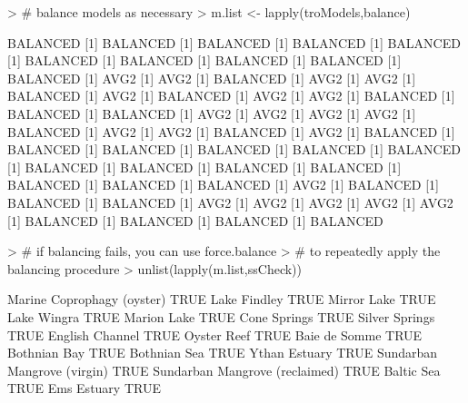\documentclass[11pt]{article}
\begin{document}
\begin{Schunk}
\begin{Sinput}
> # balance models as necessary
> m.list <- lapply(troModels,balance)
\end{Sinput}
\begin{Soutput}
[1] BALANCED
[1] BALANCED
[1] BALANCED
[1] BALANCED
[1] BALANCED
[1] BALANCED
[1] BALANCED
[1] BALANCED
[1] BALANCED
[1] BALANCED
[1] AVG2
[1] AVG2
[1] BALANCED
[1] AVG2
[1] AVG2
[1] BALANCED
[1] AVG2
[1] BALANCED
[1] AVG2
[1] AVG2
[1] BALANCED
[1] BALANCED
[1] BALANCED
[1] AVG2
[1] AVG2
[1] AVG2
[1] AVG2
[1] BALANCED
[1] AVG2
[1] AVG2
[1] BALANCED
[1] AVG2
[1] BALANCED
[1] BALANCED
[1] BALANCED
[1] BALANCED
[1] BALANCED
[1] BALANCED
[1] BALANCED
[1] BALANCED
[1] BALANCED
[1] BALANCED
[1] BALANCED
[1] BALANCED
[1] BALANCED
[1] AVG2
[1] BALANCED
[1] BALANCED
[1] BALANCED
[1] AVG2
[1] AVG2
[1] AVG2
[1] AVG2
[1] AVG2
[1] BALANCED
[1] BALANCED
[1] BALANCED
[1] BALANCED
\end{Soutput}
\begin{Sinput}
> # if balancing fails, you can use force.balance
> # to repeatedly apply the balancing procedure
> unlist(lapply(m.list,ssCheck))
\end{Sinput}
\begin{Soutput}
           Marine Coprophagy (oyster) 
                                 TRUE 
                        Lake Findley  
                                 TRUE 
                          Mirror Lake 
                                 TRUE 
                          Lake Wingra 
                                 TRUE 
                          Marion Lake 
                                 TRUE 
                         Cone Springs 
                                 TRUE 
                       Silver Springs 
                                 TRUE 
                      English Channel 
                                 TRUE 
                         Oyster Reef  
                                 TRUE 
                        Baie de Somme 
                                 TRUE 
                         Bothnian Bay 
                                 TRUE 
                         Bothnian Sea 
                                 TRUE 
                        Ythan Estuary 
                                 TRUE 
          Sundarban Mangrove (virgin) 
                                 TRUE 
       Sundarban Mangrove (reclaimed) 
                                 TRUE 
                           Baltic Sea 
                                 TRUE 
                          Ems Estuary 
                                 TRUE 

\end{Soutput}
\end{Schunk}
\end{document}
